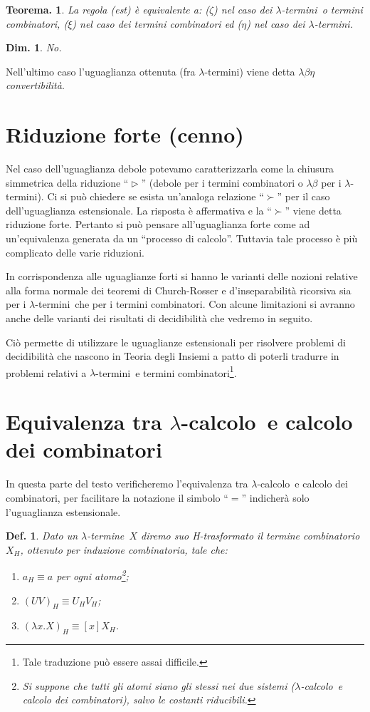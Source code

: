 \documentclass{book}
\newtheorem{definizione}{Def.}[chapter]
\newtheorem{teorema}{Teorema.}[chapter]
\newtheorem{dimostrazione}{Dim.}[chapter]
\newcommand*{\lbc}{$\lambda$-cal\-co\-lo}
\newcommand*{\lbt}{$\lambda$-ter\-mi\-ne}
\newcommand*{\lbts}{$\lambda$-ter\-mi\-ni}
\begin{document}
\begin{teorema}
La regola (est) \`e equivalente a: ($\zeta$) nel caso dei \lbts~o termini 
combinatori, ($\xi$) nel caso dei termini combinatori ed ($\eta$) nel caso dei
\lbts.
\end{teorema}
\begin{dimostrazione}
No.
\end{dimostrazione}
Nell'ultimo caso l'uguaglianza ottenuta (fra \lbts) viene detta
\emph{$\lambda \beta \eta$ convertibilit\`a}.

\section{Riduzione forte (cenno)}
Nel caso dell'uguaglianza debole potevamo caratterizzarla come la chiusura
simmetrica della riduzione ``$\vartriangleright$'' (debole per i termini
combinatori o $\lambda \beta$ per i \lbts). Ci  si pu\`o chiedere se esista
un'analoga relazione ``$\succ$'' per il caso dell'uguaglianza estensionale. La
risposta \`e affermativa e la ``$\succ$'' viene detta riduzione forte. Pertanto
si pu\`o pensare all'uguaglianza forte come ad un'equivalenza generata da un
``processo di calcolo''. Tuttavia tale processo \`e pi\`u complicato delle 
varie riduzioni.

In corrispondenza alle uguaglianze forti si hanno  le varianti delle nozioni 
relative alla forma normale dei teoremi di Church-Rosser e d'inseparabilit\`a
ricorsiva sia per i \lbts~che per i termini combinatori. Con alcune limitazioni
si avranno anche delle varianti dei risultati di decidibilit\`a che vedremo in
seguito.

Ci\`o permette di utilizzare le uguaglianze estensionali per risolvere 
problemi di decidibilit\`a che nascono in Teoria degli Insiemi a patto di
poterli tradurre in problemi relativi a \lbts~e termini combinatori\footnote{
Tale traduzione pu\`o essere assai difficile.}.

\section{Equivalenza tra \lbc~e calcolo dei combinatori}
In questa parte del testo verificheremo l'equivalenza tra \lbc~e calcolo dei 
combinatori, per facilitare la notazione il simbolo ``$=$'' indicher\`a solo
l'uguaglianza estensionale.

\begin{definizione}
Dato un \lbt~$X$ diremo suo \emph{H-trasformato} il termine combinatorio
$X_H$, ottenuto per induzione combinatoria, tale che:
\begin{enumerate}
\item[-]$a_H \equiv a$ per ogni atomo\footnote{Si suppone che tutti gli atomi
siano gli stessi nei due sistemi (\lbc~e calcolo dei combinatori), salvo le 
costanti riducibili.};
\item[-]$(UV)_H \equiv U_H V_H$;
\item[-]$(\lambda x.X)_H \equiv [x]X_H$.
\end{enumerate}
\end{definizione}
\end{document}
